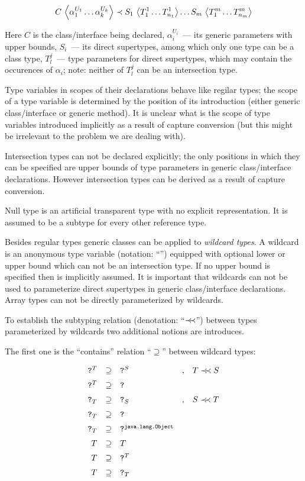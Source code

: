\[
{C}\,\left<{\alpha_1^{U_1}\dots \alpha_k^{U_k}}\right>\prec{S_1}\,\left<{T^1_1\dots T^1_{n_1}}\right>\dots{S_m}\,\left<{T^m_1\dots T^m_{n_m}}\right>
\]

Here $C$ is the class/interface being declared, $\alpha_i^{U_i}$~--- its generic parameters with upper
bounds, $S_i$~--- its direct supertypes, among which only one type can be a class type, $T^j_l$~--- type
parameters for direct supertypes, which may contain the occurences of $\alpha_i$; note: neither of $T^j_l$ can be
an intersection type.

Type variables in scopes of their declarations behave like regilar types; the scope of a type variable is
determined by the position of its introduction (either generic class/interface or generic method). It
is unclear what is the scope of type variables introduced implicitly as a result of capture
conversion (but this might be irrelevant to the problem we are dealing with).

Intersection types can not be declared explicitly; the only positions in which they can be specified are
upper bounds of type parameters in generic class/interface declarations. However intersection types can be derived
as a result of capture conversion.

Null type is an artificial transparent type with no explicit representation. It is assumed to be a subtype for
every other reference type.

Besides regular types generic classes can be applied to \emph{wildcard types}. A wildcard is an anonymous
type variable (notation: ``'') equipped with optional lower or upper bound which can not be an intersection type.
If no upper bound is specified then  is implicitly assumed. It is important that wildcards can not 
be used to parameterize direct supertypes in generic class/interface declarations. Array types can not be directly
parameterized by wildcards.

To establish the subtyping relation (denotation: ``$\prec\mathrel{\mkern-5mu}\prec$'') between types parameterized by wildcards two additional
notions are introduces.

The first one is the ``contains'' relation ``$\supseteq$'' between wildcard types:

\[
\begin{array}{rclcl}
  \texttt{?}^T&\supseteq&\texttt{?}^S&,&T\prec\mathrel{\mkern-5mu}\prec S \\[2mm]
  \texttt{?}^T&\supseteq&\texttt{?}&& \\[2mm]
  \texttt{?}_T&\supseteq&\texttt{?}_S&,&S\prec\mathrel{\mkern-5mu}\prec T\\[2mm]
  \texttt{?}_T&\supseteq&\texttt{?}&& \\[2mm]
  \texttt{?}_T&\supseteq&\texttt{?}^{\texttt{java.lang.Object}}&& \\[2mm]
  T&\supseteq& T&&\\[2mm]
  T&\supseteq&\texttt{?}^T&&\\[2mm]
  T&\supseteq&\texttt{?}_T&&
\end{array}
\]


